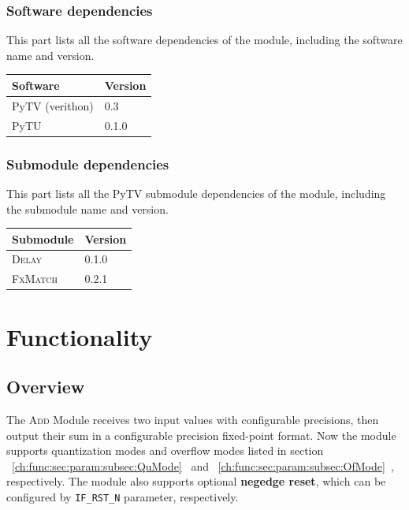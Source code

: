\documentclass[a4paper, oneside]{report}
\begin{document}
            \subsection{Software dependencies}
                This part lists all the software dependencies of the module, including the software name and version.
                \begin{longtable}{ll}
                    \toprule
                    \textbf{Software} & \textbf{Version} \\
                    \midrule
                    PyTV (verithon)     & 0.3 \\
                    PyTU                & 0.1.0 \\
                    \bottomrule
                \end{longtable}

            \subsection{Submodule dependencies}
                This part lists all the PyTV submodule dependencies of the module, including the submodule name and version.
                \begin{longtable}{ll}
                    \toprule
                    \textbf{Submodule} & \textbf{Version} \\
                    \midrule
                    \textsc{Delay}         & 0.1.0 \\
                    \textsc{FxMatch}         & 0.2.1 \\
                    \bottomrule
                \end{longtable}

    \chapter{Functionality}
        \section{Overview}
            The \textsc{Add} Module receives two input values with configurable precisions, then output their sum in a configurable precision fixed-point format. Now the module supports quantization modes and overflow modes listed in section ~\ref{ch:func:sec:param:subsec:QuMode}~ and ~\ref{ch:func:sec:param:subsec:OfMode}~, respectively.  The module also supports optional \textbf{negedge reset}, which can be configured by \texttt{IF\_RST\_N} parameter, respectively.
\end{document}
